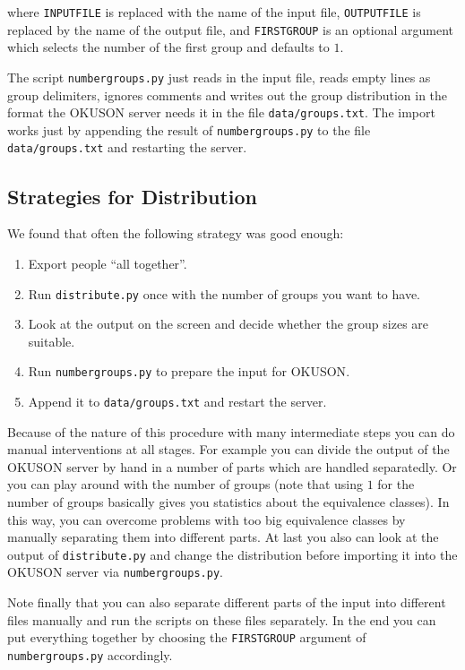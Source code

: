 \documentclass[12pt,openany,a4paper]{book}
\newcommand{\OKUSON}{\textsf{OKUSON}}
\begin{document}
where \texttt{INPUTFILE} is replaced with the name of the input file,
\texttt{OUTPUTFILE} is replaced by the name of the output file, and
\texttt{FIRSTGROUP} is an optional argument which selects the number
of the first group and defaults to $1$.

The script \texttt{numbergroups.py} just reads in the input file, reads
empty lines as group delimiters, ignores comments and writes out the
group distribution in the format the {\OKUSON} server needs it in the
file \texttt{data/groups.txt}. The import works just by appending the
result of \texttt{numbergroups.py} to the file \texttt{data/groups.txt}
and restarting the server.

\subsection{Strategies for Distribution}

We found that often the following strategy was good enough:

\begin{enumerate}
\item Export people ``all together''.
\item Run \texttt{distribute.py} once with the number of groups you want to
have.
\item Look at the output on the screen and decide whether the group sizes
are suitable.
\item Run \texttt{numbergroups.py} to prepare the input for {\OKUSON}.
\item Append it to \texttt{data/groups.txt} and restart the server.
\end{enumerate}

Because of the nature of this procedure with many intermediate steps you
can do manual interventions at all stages. For example you can divide the
output of the {\OKUSON} server by hand in a number of parts which are
handled separatedly. Or you can play around with the number of groups
(note that using $1$ for the number of groups basically gives you
statistics about the equivalence classes). In this way, you can overcome
problems with too big equivalence classes by manually separating them
into different parts. At last you also can look at the output of 
\texttt{distribute.py} and change the distribution before importing it
into the {\OKUSON} server via \texttt{numbergroups.py}.

Note finally that you can also separate different parts of the input into
different files manually and run the scripts on these files separately.
In the end you can put everything together by choosing the
\texttt{FIRSTGROUP} argument of \texttt{numbergroups.py} accordingly.
\end{document}
